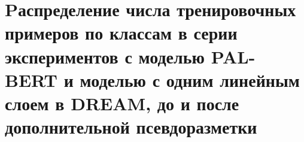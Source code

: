 \section{Pаспределение числа тренировочных примеров по классам в серии экспериментов с моделью PAL-BERT и моделью с одним линейным слоем в DREAM, до и после дополнительной псевдоразметки} \label{appendix:mtl-dream:palbert-n-samples}


\begin{table}[htbp]
\caption{Фактоидная классификация}
\label{appendix:mtl-dream:palbert:factoid}
\end{table}

\begin{table}[]
\caption{Классификация тональности}
\label{appendix:mtl-dream:palbert:sentiment}
\end{table}


